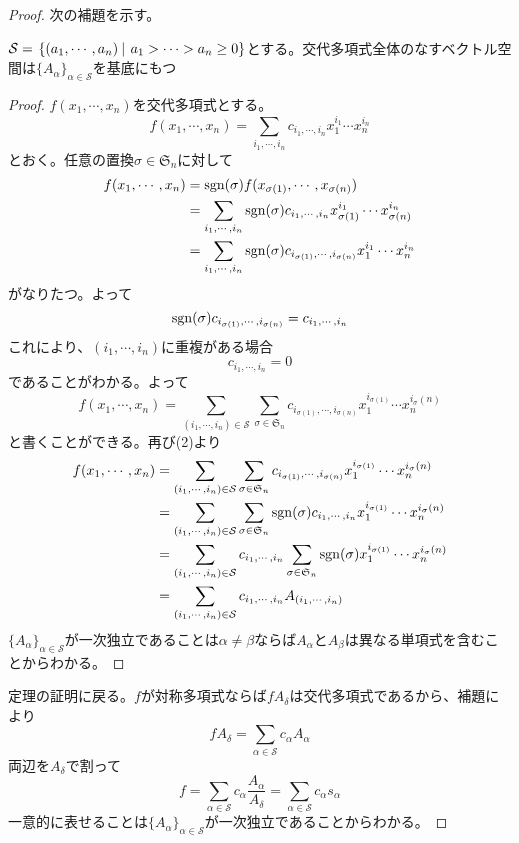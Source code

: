 \documentclass{ltjsarticle}
\begin{document}
\begin{proof}
    次の補題を示す。
    \begin{lemm}
        $\mathcal{S}=\left.\left\{(a_1,\cdots,a_n) \: \right| \: a_1>\cdots>a_n\geq 0\right\}$とする。交代多項式全体のなすベクトル空間は$\{A_\alpha\}_{\alpha\in\mathcal{S}}$を基底にもつ
    \end{lemm}
    \begin{proof}
        $f(x_1,\cdots,x_n)$を交代多項式とする。
        \[
        f(x_1,\cdots,x_n)=\sum_{i_1,\cdots,i_n}c_{i_1,\cdots,i_n}x_1^{i_1}\cdots x_n^{i_n}    
        \]
        とおく。任意の置換$\sigma\in\mathfrak{S}_n$に対して
        \begin{align*}
            f(x_1,\cdots,x_n)&=\mathrm{sgn}(\sigma)f(x_{\sigma(1)},\cdots,x_{\sigma(n)})\\
            &=\sum_{i_1,\cdots,i_n}\mathrm{sgn}(\sigma)c_{i_1,\cdots,i_n}x_{\sigma(1)}^{i_1}\cdots x_{\sigma(n)}^{i_n}\\
            &=\sum_{i_1,\cdots,i_n}\mathrm{sgn}(\sigma)c_{i_{\sigma(1)},\cdots,i_{\sigma(n)}}x_1^{i_1}\cdots x_n^{i_n}
        \end{align*}
        がなりたつ。よって
        \begin{equation}
            \mathrm{sgn}(\sigma)c_{i_{\sigma(1)},\cdots,i_{\sigma(n)}}=c_{i_1,\cdots,i_n}
        \end{equation}
        これにより、$(i_1,\cdots,i_n)$に重複がある場合
        \[
        c_{i_1,\cdots,i_n}=0
        \]
        であることがわかる。よって
        \[
        f(x_1,\cdots,x_n)=\sum_{(i_1,\cdots,i_n)\in\mathcal{S}}\sum_{\sigma\in\mathfrak{S}_n}c_{i_{\sigma(1)},\cdots,i_{\sigma(n)}}x_1^{i_{\sigma(1)}}\cdots x_n^{i_\sigma(n)}    
        \]
        と書くことができる。再び(2)より
        \begin{align*}
        f(x_1,\cdots,x_n)
        &=\sum_{(i_1,\cdots,i_n)\in\mathcal{S}}\sum_{\sigma\in\mathfrak{S}_n}c_{i_{\sigma(1)},\cdots,i_{\sigma(n)}}x_1^{i_{\sigma(1)}}\cdots x_n^{i_\sigma(n)}\\
        &=\sum_{(i_1,\cdots,i_n)\in\mathcal{S}}\sum_{\sigma\in\mathfrak{S}_n}\mathrm{sgn}(\sigma)c_{i_1,\cdots,i_n}x_1^{i_{\sigma(1)}}\cdots x_n^{i_\sigma(n)}\\
        &=\sum_{(i_1,\cdots,i_n)\in\mathcal{S}}c_{i_1,\cdots,i_n}\sum_{\sigma\in\mathfrak{S}_n}\mathrm{sgn}(\sigma)x_1^{i_{\sigma(1)}}\cdots x_n^{i_\sigma(n)}\\
        &=\sum_{(i_1,\cdots,i_n)\in\mathcal{S}}c_{i_1,\cdots,i_n}A_{(i_1,\cdots,i_n)}
        \end{align*}
        $\{A_\alpha\}_{\alpha\in\mathcal{S}}$が一次独立であることは$\alpha\neq\beta$ならば$A_\alpha$と$A_\beta$は異なる単項式を含むことからわかる。
    \end{proof}

    定理の証明に戻る。$f$が対称多項式ならば$fA_\delta$は交代多項式であるから、補題により
    \[
    fA_\delta=\sum_{\alpha\in\mathcal{S}}c_\alpha A_\alpha    
    \]
    両辺を$A_\delta$で割って
    \[
    f=\sum_{\alpha\in\mathcal{S}}c_{\alpha}\frac{A_\alpha}{A_\delta}=\sum_{\alpha\in\mathcal{S}}c_{\alpha}s_\alpha    
    \]
    一意的に表せることは$\{A_\alpha\}_{\alpha\in\mathcal{S}}$が一次独立であることからわかる。
\end{proof}
\end{document}
